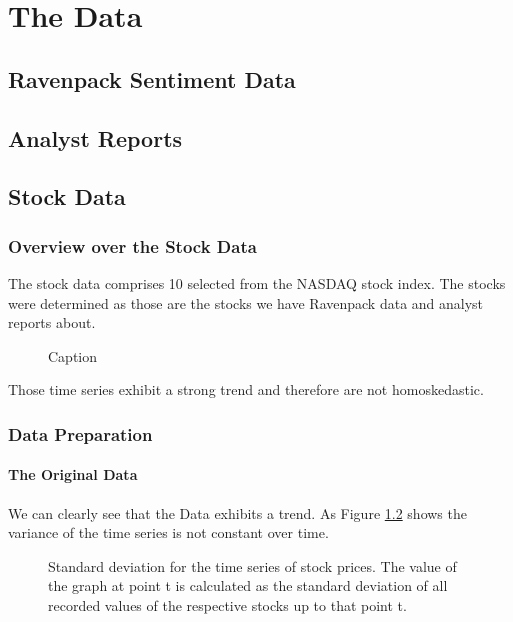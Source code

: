 \chapter{The Data}

\section{Ravenpack Sentiment Data}


\section{Analyst Reports}


\section{Stock Data}
\subsection{Overview over the Stock Data}
The stock data comprises 10 selected from the NASDAQ stock index. The stocks were determined as those are the stocks we have Ravenpack data and analyst reports about. 





\begin{figure}[h]
    \centering
    \begin{adjustbox}{width=.9\textwidth,center}
    
    \end{adjustbox}  
    \caption{Caption}
    \label{fig:Daily Stock Prices for all Stocks in the Data Set}
\end{figure}{}

Those time series exhibit a strong trend and therefore are not homoskedastic. 


\subsection{Data Preparation}
\subsubsection*{The Original Data}

We can clearly see that the Data exhibits a trend. As Figure \ref{fig:cum_sd_all} shows the variance of the time series is not constant over time. 

\begin{figure}[H]
    \centering
    \begin{adjustbox}{width=.9\textwidth,center}
    
    \end{adjustbox}  
    \caption{Standard deviation for the time series of stock prices. The value of the graph at point t is calculated as the standard deviation of all recorded values of the respective stocks up to that point t.}
    \label{fig:cum_sd_all}
\end{figure}{}

